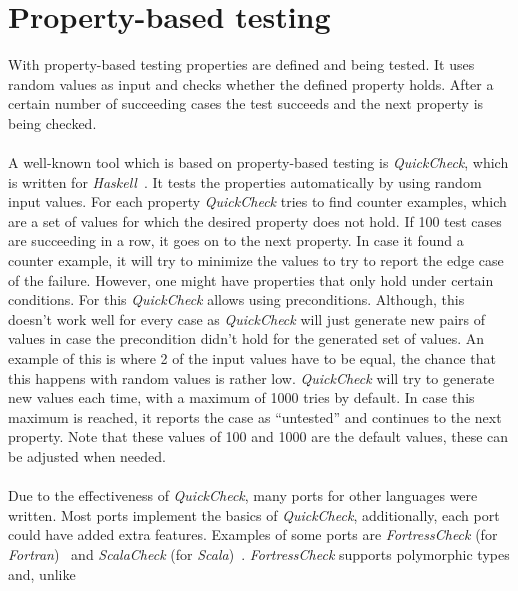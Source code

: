 \section{Property-based testing}
With property-based testing properties are defined and being tested. It uses random values as input and checks whether the defined property holds. After a certain number of succeeding cases the test succeeds and the next property is being checked.\\
\\
A well-known tool which is based on property-based testing is
\textit{QuickCheck}, which is written for
\textit{Haskell}~\cite{claessen2011quickcheck}. It tests the properties
automatically by using random input values. For each property
\textit{QuickCheck} tries to find counter examples, which are a set of values
for which the desired property does not hold. If 100 test cases are succeeding
in a row, it goes on to the next property. In case it found a counter example,
it will try to minimize the values to try to report the edge case of the
failure. However, one might have properties that only hold under certain
conditions. For this \textit{QuickCheck} allows using preconditions. Although,
this doesn't work well for every case as \textit{QuickCheck} will just generate
new pairs of values in case the precondition didn't hold for the generated set
of values. An example of this is where 2 of the input values have to be equal,
the chance that this happens with random values is rather low.
\textit{QuickCheck} will try to generate new values each time, with a maximum of
1000 tries by default. In case this maximum is reached, it reports the case as
``untested'' and continues to the next property. Note that these values of 100 and
1000 are the default values, these can be adjusted when needed.\\
\\
Due to the effectiveness of \textit{QuickCheck}, many ports for other languages
were written. Most ports implement the basics of \textit{QuickCheck},
additionally, each port could have added extra features. Examples of some ports
are \textit{FortressCheck} (for \textit{Fortran})~\cite{kang2011fortresscheck}
and \textit{ScalaCheck} (for \textit{Scala})~\cite{siteScalaCheck2015}.
\textit{FortressCheck} supports polymorphic types and, unlike
